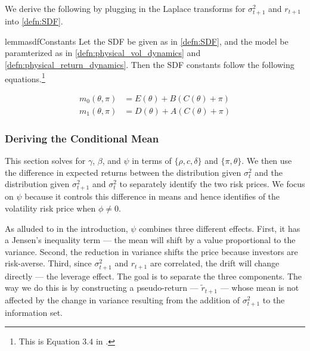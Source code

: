 \documentclass[11pt, letterpaper, twoside]{article}
\begin{document}
We derive the following by plugging in the Laplace transforms for $\sigma^2_{t+1}$ and $r_{t+1}$ into \cref{defn:SDF}.

\begin{restatable}{lemma}{sdfConstants}
    \label{lemma:characterizing_sdf_integration_constants}
    Let the SDF be given as in \cref{defn:SDF}, and the model be paramterized as in \cref{defn:physical_vol_dynamics} and \cref{defn:physical_return_dynamics}.  Then the SDF constants follow the following equations.\footnote{This is Equation $3.4$ in \textcite[3.4]{han2018leverage}.}
    
    \begin{align}
        \label{eqn:sdf_functions_vs_physical_functions}
        m_0(\theta, \pi) &= E(\theta) + B(C(\theta) + \pi) \\
        m_1(\theta, \pi) &= D(\theta) + A(C(\theta) + \pi) \nonumber
    \end{align}
    
\end{restatable}


\subsubsection{Deriving the Conditional Mean}\label{sec:deriving_conditional_mean}


This section solves for $\gamma$, $\beta$, and $\psi$ in terms of $\lbrace \rho, c, \delta \rbrace$ and $\lbrace \pi, \theta \rbrace$. We then use the difference in expected returns between the distribution given $\sigma^2_t$ and the distribution given $\sigma^2_{t+1}$ and $\sigma^2_t$ to separately identify the two risk prices. We focus on $\psi$ because it controls this difference in means and hence identifies of the volatility risk price when $\phi \neq 0$.

As alluded to in the introduction, $\psi$ combines three different effects. First, it has a Jensen's inequality term --- the mean will shift by a value proportional to the variance. Second, the reduction in variance shifts the price because investors are risk-averse. Third, since $\sigma^2_{t+1}$ and $r_{t+1}$ are correlated, the drift will change directly ---  the leverage effect. The goal is to separate the three components. The way we do this is by constructing a pseudo-return --- $\widetilde{r}_{t+1}$ --- whose mean is not affected by the change in variance resulting from the addition of $\sigma^2_{t+1}$ to the information set.
\end{document}
